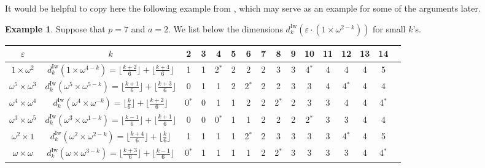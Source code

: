 \documentclass[12pt]{amsart}
\theoremstyle{definition}
\newtheorem{example}[subsection]{Example}
\numberwithin{equation}{subsection}
\newcommand{\Iw}{\mathrm{Iw}}
\begin{document}
It would be helpful to copy here the following example from \cite[Example~2.25]{liu-truong-xiao-zhao}, which may serve as an example for some of the arguments later.
\begin{example}
\label{Ex:p=7a=2}
Suppose that $p=7$ and $a=2$. We list below the dimensions $d_k^{\Iw}(\varepsilon\cdot (1\times \omega^{2-k}))$ for small $k$'s.


\begin{center}
\begin{tabular}{|c|c|c|c|c|c|c|c|c|c|c|c|c|c|c|c|}
\hline $\varepsilon$ &
$k$ & 2& 3 & 4 &  5 & 6 & 7 & 8 & 9 & 10 & 11 & 12&13&14 
\\ \hline
$1 \times \omega^2$ &
$d_{k}^\Iw(1 \times \omega^{4-k}) = \lfloor \frac{k+2}6\rfloor + \lfloor \frac{k+4}6\rfloor$ &
1& 1& 2${}^*$& 2& 2& 2& 3 & 3& 4${}^*$ & 4& 4& 4& 5 
\\ \hline
$\omega^5 \times \omega^3$ &
$d_{k}^\Iw(\omega^5 \times \omega^{5-k})= \lfloor \frac{k+1}6\rfloor + \lfloor \frac{k+3}6\rfloor$ & 0&
1& 1& 2& 2${}^*$& 2& 2& 3 & 3& 4 & 4${}^*$& 4& 4
\\ \hline
$\omega^4 \times \omega^4$ &
$d_{k}^\Iw(\omega^4 \times \omega^{-k})= \lfloor \frac{k}6\rfloor + \lfloor \frac{k+2}6\rfloor$ & 0${}^*$& 0&
1& 1& 2& 2& 2${}^*$& 2& 3 & 3& 4 & 4& 4${}^*$
\\ \hline
$\omega^3 \times \omega^5$ &
$d_{k}^\Iw(\omega^3 \times \omega^{1-k}) = \lfloor \frac{k-1}6\rfloor + \lfloor \frac{k+1}6\rfloor$ & 0 & 0 & 0${}^*$&
1& 1& 2& 2& 2& 2${}^*$& 3 & 3& 4 & 4
\\ \hline
$\omega^2 \times 1$ &
$d_{k}^\Iw(\omega^2 \times \omega^{2-k}) =  \lfloor \frac{k+4}6\rfloor + \lfloor \frac{k}6\rfloor$ & 1& 1& 1& 1& 2${}^*$& 2& 3& 3& 3& 3& 4${}^*$& 4& 5
\\ \hline
$\omega \times \omega$ &
$d_{k}^\Iw(\omega \times \omega^{3-k}) = \lfloor \frac{k+3}6\rfloor + \lfloor \frac{k-1}6\rfloor$ & 0${}^*$&  1& 1& 1& 1& 2& 2${}^*$& 3& 3& 3& 3& 4& 4${}^*$
\\ \hline
\end{tabular}
\end{center}


\end{example}
\end{document}

